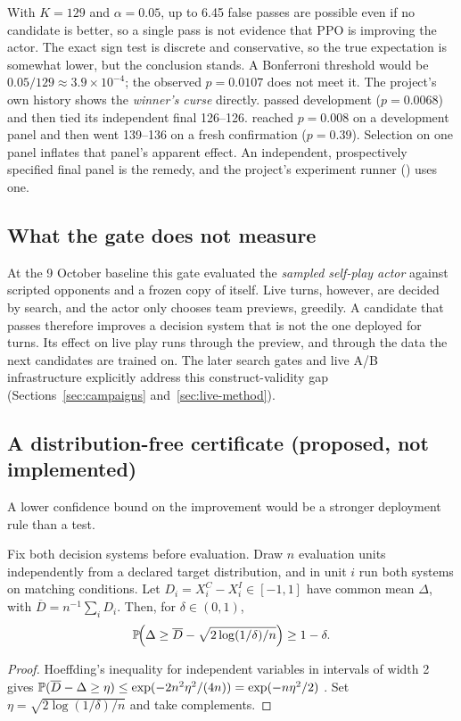 With $K=129$ and $\alpha=0.05$, up to 6.45 false passes are possible even if
no candidate is better, so a single pass is not evidence that PPO is improving
the actor. The exact sign test is discrete and conservative, so the true
expectation is somewhat lower, but the conclusion stands. A Bonferroni
threshold would be $0.05/129\approx3.9\times10^{-4}$; the observed $p=0.0107$
does not meet it. The project's own history shows the \emph{winner's curse}
directly.  passed development ($p=0.0068$) and then tied its
independent final 126--126.  reached $p=0.008$ on a
development panel and then went 139--136 on a fresh confirmation ($p=0.39$).
Selection on one panel inflates that panel's apparent effect. An independent,
prospectively specified final panel is the remedy, and the project's
experiment runner () uses one.

\subsection{What the gate does not measure}
At the 9 October baseline this gate evaluated the \emph{sampled self-play actor} against
scripted opponents and a frozen copy of itself. Live turns, however, are
decided by search, and the actor only chooses team previews, greedily. A
candidate that passes therefore improves a decision system that is not the
one deployed for turns. Its effect on live play runs through the preview, and
through the data the next candidates are trained on.
The later search gates and live A/B infrastructure explicitly address this
construct-validity gap (Sections~\ref{sec:campaigns} and~\ref{sec:live-method}).

\subsection{A distribution-free certificate (proposed, not implemented)}
\label{sec:certificate}
A lower confidence bound on the improvement would be a stronger deployment
rule than a test.

\begin{theorem}
\label{thm:evaluation}
Fix both decision systems before evaluation. Draw $n$ evaluation units
independently from a declared target distribution, and in unit $i$ run both
systems on matching conditions. Let $D_i=X_i^C-X_i^I\in[-1,1]$ have common
mean $\Delta$, with $\overline D=n^{-1}\sum_iD_i$. Then, for $\delta\in(0,1)$,
\begin{equation}
  \mathbb{P}\!\Big(\Delta\ge\overline D-\sqrt{2\log(1/\delta)/n}\Big)\ge1-\delta.
\label{eq:certificate}
\end{equation}
\end{theorem}
\begin{proof}
Hoeffding's inequality for independent variables in intervals of width 2
gives $\mathbb{P}(\overline D-\Delta\ge\eta)\le\exp(-2n^2\eta^2/(4n))=\exp(-n\eta^2/2)$
\citep{hoeffding}. Set $\eta=\sqrt{2\log(1/\delta)/n}$ and take complements.
\end{proof}

